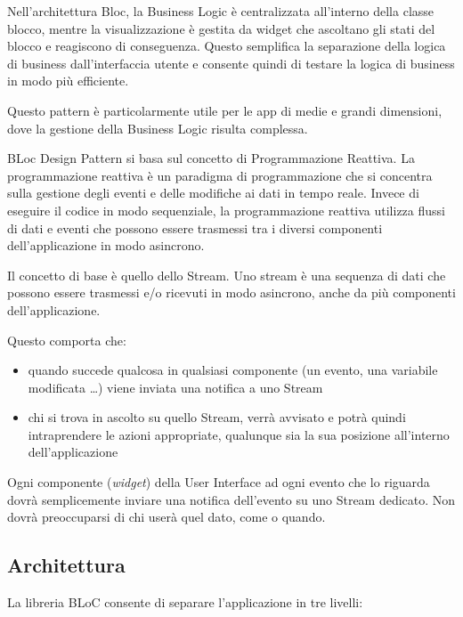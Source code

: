 \documentclass[a4paper, oneside, 12pt]{article}
\begin{document}
Nell'architettura Bloc, la Business Logic è centralizzata all'interno della classe blocco, mentre la visualizzazione è gestita da widget che ascoltano 
gli stati del blocco e reagiscono di conseguenza. Questo semplifica la separazione della logica di business dall'interfaccia utente e consente quindi 
di testare la logica di business in modo più efficiente. 

Questo pattern è particolarmente utile per le app di medie e grandi dimensioni, dove la gestione della Business Logic risulta complessa. 

BLoc Design Pattern si basa sul concetto di Programmazione Reattiva. La programmazione reattiva è un paradigma di programmazione che si concentra 
sulla gestione degli eventi e delle modifiche ai dati in tempo reale. Invece di eseguire il codice in modo sequenziale, la programmazione reattiva 
utilizza flussi di dati e eventi che possono essere trasmessi tra i diversi componenti dell'applicazione in modo asincrono. 

Il concetto di base è quello dello Stream. Uno stream è una sequenza di dati che possono essere trasmessi e/o ricevuti in modo asincrono,
anche da più componenti dell'applicazione.

Questo comporta che:
\begin{itemize}
	\item quando succede qualcosa in qualsiasi componente (un evento, una variabile modificata \ldots) viene inviata una notifica a uno Stream
	\item chi si trova in ascolto su quello Stream, verrà avvisato e potrà quindi intraprendere le azioni appropriate, qualunque sia la sua posizione all'interno dell'applicazione
\end{itemize}

Ogni componente (\textit{widget}) della User Interface ad ogni evento che lo riguarda dovrà semplicemente inviare una notifica dell'evento su uno Stream dedicato. 
Non dovrà preoccuparsi di chi userà quel dato, come o quando.

\newpage
\subsection{Architettura}
La libreria BLoC consente di separare l'applicazione in tre livelli:
\end{document}
